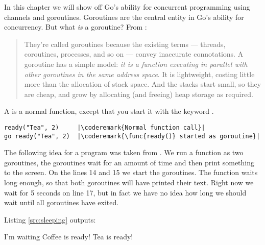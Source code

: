 \noindent{}In this chapter we will show off Go's ability for
concurrent programming using channels and goroutines. Goroutines
are the central entity in Go's ability for concurrency. But what
\emph{is} a goroutine? From \cite{effective_go}:
\begin{quote}
They're called goroutines because the existing terms --- threads, coroutines,
processes, and so on --- convey inaccurate connotations. A goroutine has a simple
model: \emph{it is a function executing in parallel with other goroutines in the same
address space}. It is lightweight, costing little more than the allocation of
stack space. And the stacks start small, so they are cheap, and grow by
allocating (and freeing) heap storage as required.
\end{quote}
A  is a normal function, except that you start
it with the keyword .
\begin{lstlisting}
ready("Tea", 2)	    |\coderemark{Normal function call}|
go ready("Tea", 2)  |\coderemark{\func{ready()} started as goroutine}|
\end{lstlisting}
The following idea for a program was taken from \cite{go_course_day3}. 
We run a function as two goroutines, the goroutines wait for an amount of
time and then print something to the screen. 
On the lines 14 and 15 we start the goroutines.
The  function
waits long enough, so that both goroutines will have printed their text. Right
now we wait for 5 seconds on line 17, but in fact we have no idea how
long we should wait until all goroutines have exited.

Listing \ref{src:sleeping} outputs:
\begin{display}
I'm waiting         
Coffee is ready!    
Tea is ready!       
\end{display}

